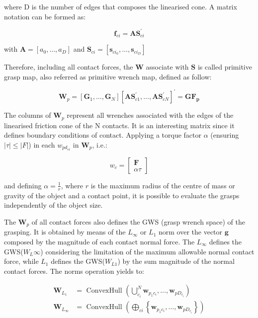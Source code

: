 where D is the number of edges that composes the linearised cone. A matrix notation can be formed as:

\begin{equation}
	\mathbf{f}_{ci}=\mathbf{A} \mathbf{S}_{ci}^{\prime}
\end{equation}

with $\mathbf{A}=\left[a_{0}, \ldots, a_{D}\right]$ and $\mathbf{S}_{ci}=\left[\mathbf{s}_{ci_0}, \ldots, \mathbf{s}_{ci_D}\right]$

Therefore, including all contact forces, the $\mathbf{W}$ associate with $\mathbf{S}$ is called primitive grasp map, also referred as primitive wrench map, defined as follow:

\begin{equation}
	\mathbf{W}_{p}=\left[\mathbf{G}_{1}, \ldots, \mathbf{G}_{N}\right]\left[\mathbf{A} \mathbf{S}_{c 1}^{\prime}, \ldots, \mathbf{A} \mathbf{S}_{c N}^{\prime}\right]^{\prime}=\mathbf{G} \mathbf{F}_{\mathbf{p}}
\end{equation}

The columns of $\mathbf{W}_{p}$ represent all wrenches associated with the edges of the linearised friction cone of the N contacts. It is an interesting matrix since it defines boundary conditions of contact. Applying a torque factor $\alpha$ (ensuring $|\tau| \leq|F|$) in each $w_{pd_{ci}}$ in $\mathbf{W}_{p}$, i.e.:

\begin{equation}
	w_{c}=\left[\begin{array}{c}
		\boldsymbol{F} \\
		\alpha \tau
	\end{array}\right]
\end{equation}

and defining $\alpha=\frac{1}{r}$, where $r$ is the maximum radius of the centre of mass or gravity of the object and a contact point, it is possible to evaluate the grasps independently of the object size.

The $\mathbf{W}_p$ of all contact forces also defines the GWS (grasp wrench space) of the grasping. It is obtained by means of the $L_\infty$ or $L_1$ norm over the vector $\mathbf{g}$ composed by the magnitude of each contact normal force. The $L_\infty$ defines the GWS($W_L\infty$) considering the limitation of the maximum allowable normal contact force, while $L_1$ defines the GWS($W_{L1}$) by the sum magnitude of the normal contact forces. The norms operation yields to:


\begin{equation}
\begin{aligned}
\mathbf{W}_{L_{1}} &=\text { ConvexHull }\left(\bigcup_{c_i}^{N} \mathbf{w}_{p_1 c_i}, \ldots, \mathbf{w}_{p D_{c_i}}\right) \\
\mathbf{W}_{L_{\infty}} &=\text { ConvexHull }\left(\bigoplus_{c i}\left\{\mathbf{w}_{p_1 c_i}, \ldots, \mathbf{w}_{p D_{c_i}}\right\}\right)
\end{aligned}
\end{equation}

